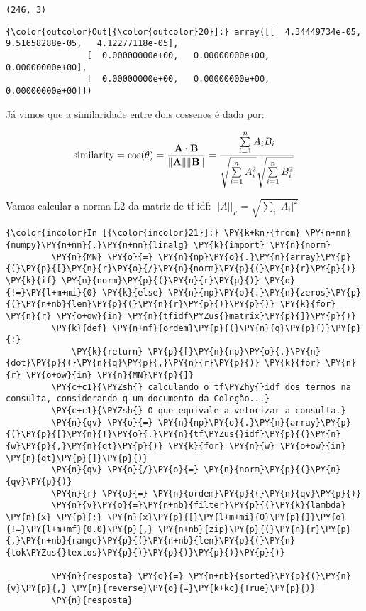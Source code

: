     \begin{Verbatim}[commandchars=\\\{\}]
(246, 3)

    \end{Verbatim}

            \begin{Verbatim}[commandchars=\\\{\}]
{\color{outcolor}Out[{\color{outcolor}20}]:} array([[  4.34449734e-05,   9.51658288e-05,   4.12277118e-05],
                [  0.00000000e+00,   0.00000000e+00,   0.00000000e+00],
                [  0.00000000e+00,   0.00000000e+00,   0.00000000e+00]])
\end{Verbatim}
        
    Já vimos que a similaridade entre dois cossenos é dada por:

\[\text{similarity} = \cos(\theta) = {\mathbf{A} \cdot \mathbf{B} \over \|\mathbf{A}\| \|\mathbf{B}\|} = \frac{ \sum\limits_{i=1}^{n}{A_i  B_i} }{ \sqrt{\sum\limits_{i=1}^{n}{A_i^2}}  \sqrt{\sum\limits_{i=1}^{n}{B_i^2}} }\]

Vamos calcular a norma L2 da matriz de tf-idf:
\(||A||_F = \sqrt{\sum_{i} |A_{i}|^2}\)

    \begin{Verbatim}[commandchars=\\\{\}]
{\color{incolor}In [{\color{incolor}21}]:} \PY{k+kn}{from} \PY{n+nn}{numpy}\PY{n+nn}{.}\PY{n+nn}{linalg} \PY{k}{import} \PY{n}{norm}
         \PY{n}{MN} \PY{o}{=} \PY{n}{np}\PY{o}{.}\PY{n}{array}\PY{p}{(}\PY{p}{[}\PY{n}{r}\PY{o}{/}\PY{n}{norm}\PY{p}{(}\PY{n}{r}\PY{p}{)} \PY{k}{if} \PY{n}{norm}\PY{p}{(}\PY{n}{r}\PY{p}{)} \PY{o}{!=}\PY{l+m+mi}{0} \PY{k}{else} \PY{n}{np}\PY{o}{.}\PY{n}{zeros}\PY{p}{(}\PY{n+nb}{len}\PY{p}{(}\PY{n}{r}\PY{p}{)}\PY{p}{)} \PY{k}{for} \PY{n}{r} \PY{o+ow}{in} \PY{n}{tfidf\PYZus{}matrix}\PY{p}{]}\PY{p}{)}
         \PY{k}{def} \PY{n+nf}{ordem}\PY{p}{(}\PY{n}{q}\PY{p}{)}\PY{p}{:}
             \PY{k}{return} \PY{p}{[}\PY{n}{np}\PY{o}{.}\PY{n}{dot}\PY{p}{(}\PY{n}{q}\PY{p}{,}\PY{n}{r}\PY{p}{)} \PY{k}{for} \PY{n}{r} \PY{o+ow}{in} \PY{n}{MN}\PY{p}{]}
         \PY{c+c1}{\PYZsh{} calculando o tf\PYZhy{}idf dos termos na consulta, considerando q um documento da Coleção...}
         \PY{c+c1}{\PYZsh{} O que equivale a vetorizar a consulta.}
         \PY{n}{qv} \PY{o}{=} \PY{n}{np}\PY{o}{.}\PY{n}{array}\PY{p}{(}\PY{p}{[}\PY{n}{T}\PY{o}{.}\PY{n}{tf\PYZus{}idf}\PY{p}{(}\PY{n}{w}\PY{p}{,}\PY{n}{qt}\PY{p}{)} \PY{k}{for} \PY{n}{w} \PY{o+ow}{in} \PY{n}{qt}\PY{p}{]}\PY{p}{)}
         \PY{n}{qv} \PY{o}{/}\PY{o}{=} \PY{n}{norm}\PY{p}{(}\PY{n}{qv}\PY{p}{)}
         \PY{n}{r} \PY{o}{=} \PY{n}{ordem}\PY{p}{(}\PY{n}{qv}\PY{p}{)}
         \PY{n}{v}\PY{o}{=}\PY{n+nb}{filter}\PY{p}{(}\PY{k}{lambda} \PY{n}{x} \PY{p}{:} \PY{n}{x}\PY{p}{[}\PY{l+m+mi}{0}\PY{p}{]}\PY{o}{!=}\PY{l+m+mf}{0.0}\PY{p}{,} \PY{n+nb}{zip}\PY{p}{(}\PY{n}{r}\PY{p}{,}\PY{n+nb}{range}\PY{p}{(}\PY{n+nb}{len}\PY{p}{(}\PY{n}{tok\PYZus{}textos}\PY{p}{)}\PY{p}{)}\PY{p}{)}\PY{p}{)}
         
         \PY{n}{resposta} \PY{o}{=} \PY{n+nb}{sorted}\PY{p}{(}\PY{n}{v}\PY{p}{,} \PY{n}{reverse}\PY{o}{=}\PY{k+kc}{True}\PY{p}{)} 
         \PY{n}{resposta}
\end{Verbatim}

